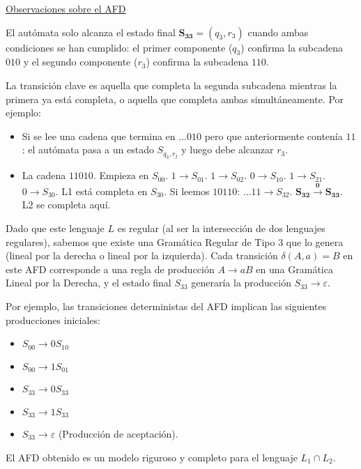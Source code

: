 \begin{solucion}
\begin{enumerate}
\begin{enumerate}
\underline{Observaciones sobre el AFD}

 El autómata solo alcanza el estado final $\mathbf{S_{33}} = (q_3, r_3)$ cuando ambas condiciones se han cumplido: el primer componente ($q_3$) confirma la subcadena $010$ y el segundo componente ($r_3$) confirma la subcadena $110$.

 La transición clave es aquella que completa la segunda subcadena mientras la primera ya está completa, o aquella que completa ambas simultáneamente. Por ejemplo:
\begin{itemize}
    \item Si se lee una cadena que termina en $...010$ pero que anteriormente contenía $11$: el autómata pasa a un estado $S_{q_3, r_j}$ y luego debe alcanzar $r_3$.
    \item La cadena $11010$. Empieza en $S_{00}$. $1 \to S_{01}$. $1 \to S_{02}$. $0 \to S_{10}$. $1 \to S_{21}$. $0 \to S_{30}$. L1 está completa en $S_{30}$. Si leemos $10110$: $...11 \to S_{32}$. $\mathbf{S_{32} \xrightarrow{0} S_{33}}$. L2 se completa aquí.
\end{itemize}

 Dado que este lenguaje $L$ es regular (al ser la intersección de dos lenguajes regulares), sabemos que existe una Gramática Regular de Tipo 3 que lo genera (lineal por la derecha o lineal por la izquierda). Cada transición $\delta(A, a) = B$ en este AFD corresponde a una regla de producción $A \to aB$ en una Gramática Lineal por la Derecha, y el estado final $S_{33}$ generaría la producción $S_{33} \to \varepsilon$.

Por ejemplo, las transiciones deterministas del AFD implican las siguientes producciones iniciales:
\begin{itemize}
    \item $S_{00} \to 0S_{10}$
    \item $S_{00} \to 1S_{01}$
    \item $S_{33} \to 0S_{33}$
    \item $S_{33} \to 1S_{33}$
    \item $S_{33} \to \varepsilon$ (Producción de aceptación).
\end{itemize}

El AFD obtenido es un modelo riguroso y completo para el lenguaje $L_1 \cap L_2$.

\end{enumerate}
\end{enumerate}



\end{solucion}

